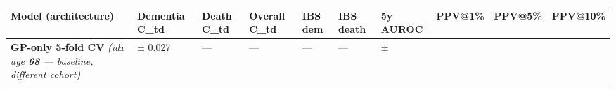 \documentclass[
  11pt,
]{article}
\newcounter{none} %
\begin{document}
{\def\LTcaptype{none} %
{\scriptsize
\begin{longtable}[]{|>{\raggedright\arraybackslash}p{}|>{\raggedright\arraybackslash}p{}|>{\raggedright\arraybackslash}p{}|>{\raggedright\arraybackslash}p{}|>{\raggedright\arraybackslash}p{}|>{\raggedright\arraybackslash}p{}|>{\raggedright\arraybackslash}p{}|>{\raggedright\arraybackslash}p{}|>{\raggedright\arraybackslash}p{}|>{\raggedright\arraybackslash}p{}|}
\hline
\begin{minipage}[b]{\linewidth}\raggedright
Model (architecture)
\end{minipage} & \begin{minipage}[b]{\linewidth}\raggedright
Dementia C\_td
\end{minipage} & \begin{minipage}[b]{\linewidth}\raggedright
Death C\_td
\end{minipage} & \begin{minipage}[b]{\linewidth}\raggedright
Overall C\_td
\end{minipage} & \begin{minipage}[b]{\linewidth}\raggedright
IBS dem
\end{minipage} & \begin{minipage}[b]{\linewidth}\raggedright
IBS death
\end{minipage} & \begin{minipage}[b]{\linewidth}\raggedright
5y AUROC
\end{minipage} & \begin{minipage}[b]{\linewidth}\raggedright
PPV@1\%
\end{minipage} & \begin{minipage}[b]{\linewidth}\raggedright
PPV@5\%
\end{minipage} & \begin{minipage}[b]{\linewidth}\raggedright
PPV@10\%
\end{minipage} \\
\hline
\hline
\endhead
\hline
\endlastfoot
\textbf{GP-only 5-fold CV} \emph{(idx age \textbf{68} --- baseline,
different cohort)} & 0.8240 ± 0.027 & --- & --- & --- & --- & 0.8108 ±

\end{longtable}}}
\end{document}
